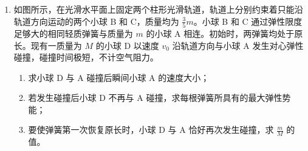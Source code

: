 \documentclass[\gkver]{gaokaozhenti}
\begin{document}
\begin{enumerate}
{保持电流大小不变，方向反向，则安培力方向反向，由牛顿第二定律有 $f + F - \frac{F}{k} = ma$

又有 $v_{0}^{2}=2as$

解得线框 $cd$ 边所受安培力大小为 $F=\frac{kmv_{0}^{2}}{4s\left(k-1\right)}$

线框 $cd$ 边所受安培力的平均功率 $P = F \bar{v} = F \cdot \frac{v_{0}}{2} = \frac{km v_{0}^{3}}{8s(k-1)}$
}

\item
如图所示，在光滑水平面上固定两个柱形光滑轨道，轨道上分别约束着只能沿轨道方向运动的两个小球 B 和 C，质量均为 $\frac{3}{5}m$。小球 B 和 C 通过弹性限度足够大的相同轻质弹簧与质量为 $m$ 的小球 A 相连。初始时，两弹簧均处于原长。现有一质量为 $M$ 的小球 D 以速度 $v_{0}$ 沿轨道方向与小球 A 发生对心弹性碰撞，碰撞时间极短，不计空气阻力。
\begin{enumerate}
	\item
	求小球 D 与 A 碰撞后瞬间小球 A 的速度大小；
	\item
	若发生碰撞后小球 D 不再与 A 碰撞，求每根弹簧所具有的最大弹性势能；
	\item
	要使弹簧第一次恢复原长时，小球 D 与 A 恰好再次发生碰撞，求 $\frac{m}{M}$ 的值。
\end{enumerate}
\onepicture[w=8.0cm, align=right]{}
\end{enumerate}
\end{document}
